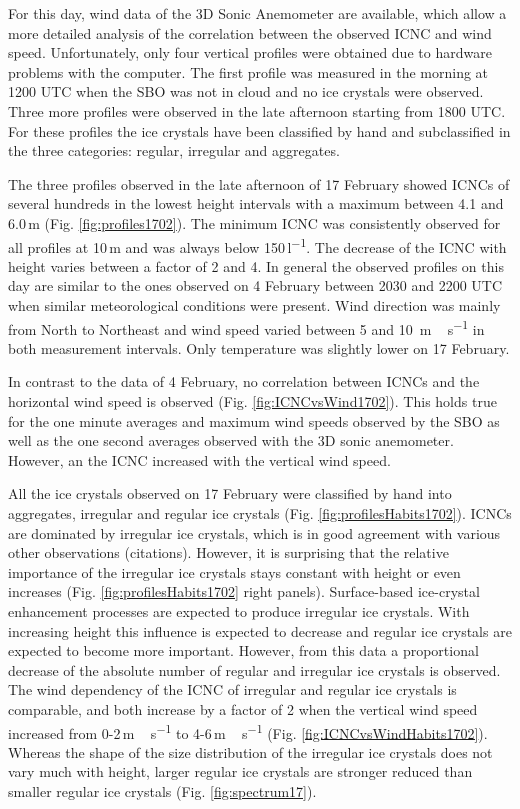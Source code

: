 \documentclass[draft,linenumbers]{agujournal}
\begin{document}
For this day, wind data of the 3D Sonic Anemometer are available, which allow a more detailed analysis of the correlation between the observed ICNC and wind speed. Unfortunately, only four vertical profiles were obtained  due to hardware problems with the computer. The first profile was measured in the morning at 1200 UTC when the SBO was not in cloud and no ice crystals were observed. Three more profiles were observed in the late afternoon starting from 1800 UTC. For these profiles the ice crystals have been classified by hand and subclassified in the three categories: regular, irregular and aggregates.

The three profiles observed in the late afternoon of 17 February showed ICNCs of several hundreds in the lowest height intervals with a maximum between 4.1 and 6.0\,\si{m} (Fig. \ref{fig:profiles1702}). The minimum ICNC was consistently observed for all profiles at 10\,\si{m} and was always below 150\,\si{l^{-1}}. The decrease of the ICNC with height varies between a factor of 2 and 4. In general the observed profiles on this day are similar to the ones observed on 4 February between 2030 and 2200 UTC when similar meteorological conditions were present. Wind direction was mainly from North to Northeast and wind speed varied between 5 and 10 \,\si{m\,s^{-1}} in both measurement intervals. Only temperature was slightly lower on 17 February.

In contrast to the data of 4 February, no correlation between ICNCs and the horizontal wind speed is observed (Fig. \ref{fig:ICNCvsWind1702}). This holds true for the one minute averages and maximum wind speeds observed by the SBO as well as the one second averages observed with the 3D sonic anemometer. However, an the ICNC increased with the vertical wind speed. 

All the ice crystals observed on 17 February were classified by hand into aggregates, irregular and regular ice crystals (Fig. \ref{fig:profilesHabits1702}). ICNCs are dominated by irregular ice crystals, which is in good agreement with various other observations (citations). However, it is surprising that the relative importance of the irregular ice crystals stays constant with height or even increases (Fig. \ref{fig:profilesHabits1702} right panels). Surface-based ice-crystal enhancement processes are expected to produce irregular ice crystals. With increasing height this influence is expected to decrease and regular ice crystals are expected to become more important. However, from this data a proportional decrease of the absolute number of regular and irregular ice crystals is observed. The wind dependency of the ICNC of irregular and regular ice crystals is comparable, and both increase by a factor of 2 when the vertical wind speed increased from 0-2\,\si{m\,s^{-1}} to 4-6\,\si{m\,s^{-1}} (Fig. \ref{fig:ICNCvsWindHabits1702}). Whereas the shape of the size distribution of the irregular ice crystals does not vary much with height, larger regular ice crystals are stronger reduced than smaller regular ice crystals (Fig. \ref{fig:spectrum17}). 
\end{document}
